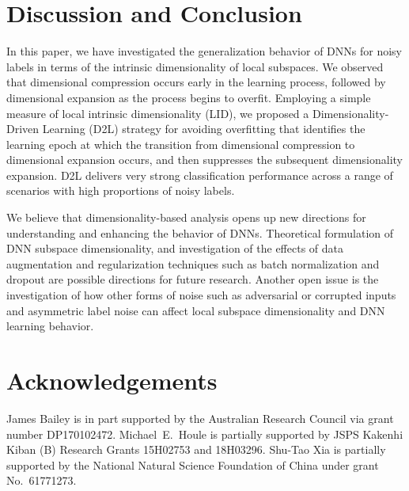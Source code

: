 \documentclass{article}
\begin{document}
\section{Discussion and Conclusion}
In this paper, we have investigated the generalization behavior of DNNs for noisy labels in terms of the intrinsic dimensionality of local subspaces. We observed that dimensional compression occurs early in the learning process, followed by dimensional expansion as the process begins to overfit. Employing a simple measure of local intrinsic dimensionality (LID), we proposed a Dimensionality-Driven Learning (D2L) strategy for avoiding overfitting that identifies the learning epoch at which the transition from dimensional compression to dimensional expansion occurs, and then suppresses the subsequent dimensionality expansion. D2L delivers very strong classification performance across a range of scenarios with high proportions of noisy labels.   

We believe that dimensionality-based analysis opens up new directions for understanding and enhancing the behavior of DNNs.
Theoretical formulation of DNN subspace dimensionality, and investigation of the effects of data augmentation and regularization techniques such as batch normalization \cite{ioffe2015batch} and dropout \cite{srivastava2014dropout} are possible directions for future research.  
Another open issue is the investigation of how other forms of noise such as adversarial or corrupted inputs and asymmetric label noise
can affect local subspace dimensionality and DNN learning behavior.



\section*{Acknowledgements}
James Bailey is in part supported by the Australian Research Council via grant number DP170102472. Michael~E.~Houle is partially supported by JSPS Kakenhi Kiban (B) Research Grants 15H02753 and 18H03296. Shu-Tao Xia is partially supported by the National Natural Science Foundation of China under grant No.~61771273.


\end{document}
